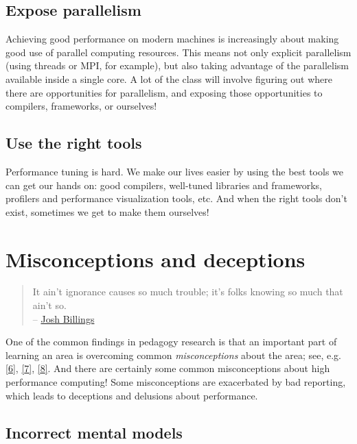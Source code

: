 \documentclass[12pt, leqno]{article} %
\begin{document}
\subsection{Expose parallelism}

Achieving good performance on modern machines is increasingly about
making good use of parallel computing resources. This means not only
explicit parallelism (using threads or MPI, for example), but also
taking advantage of the parallelism available inside a single core. A
lot of the class will involve figuring out where there are opportunities
for parallelism, and exposing those opportunities to compilers,
frameworks, or ourselves!

\subsection{Use the right tools}

Performance tuning is hard. We make our lives easier by using the best
tools we can get our hands on: good compilers, well-tuned libraries and
frameworks, profilers and performance visualization tools, etc. And when
the right tools don't exist, sometimes we get to make them ourselves!

\section{Misconceptions and deceptions}

\begin{quote}
It ain't ignorance causes so much trouble; it's folks knowing so much
that ain't so.\\--
\href{http://www.famous-quotes.com/author.php?page=3\&total=81\&aid=733}{Josh
Billings}
\end{quote}

One of the common findings in pedagogy research is that an important
part of learning an area is overcoming common \emph{misconceptions}
about the area; see, e.g.
\href{http://www.lifescied.org/content/13/2/179.abstract}{{[}6{]}},
\href{http://aer.sagepub.com/content/50/5/1020}{{[}7{]}},
\href{http://sydney.edu.au/science/physics/pdfs/research/super/PhD(Muller).pdf}{{[}8{]}}.
And there are certainly some common misconceptions about high
performance computing! Some misconceptions are exacerbated by bad
reporting, which leads to deceptions and delusions about performance.

\subsection{Incorrect mental models}
\end{document}
